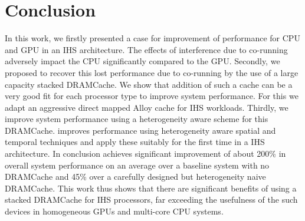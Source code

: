 \section{Conclusion} \label{conclusion}
In this work, we firstly presented a case for improvement of performance for CPU and GPU in an IHS architecture. The effects of interference due to co-running adversely impact the CPU significantly compared to the GPU. Secondly, we proposed to recover this lost performance due to co-running by the use of a large capacity stacked DRAMCache. We show that addition of such a cache can be a very good fit for each processor type to improve system performance. For this we adapt an aggressive direct mapped Alloy cache for IHS workloads. Thirdly, we improve system performance using a heterogeneity aware scheme for this DRAMCache. \cachename improves performance using heterogeneity aware spatial and temporal techniques and apply these suitably for the first time in a IHS architecture. In conclusion \cachename achieves significant improvement of about 200\% in overall system performance on an average over a baseline system with no DRAMCache and 45\% over a carefully designed but heterogeneity naive DRAMCache. This work thus shows that there are significant benefits of using a stacked DRAMCache for IHS processors, far exceeding the usefulness of the such devices in homogeneous GPUs and multi-core CPU systems.